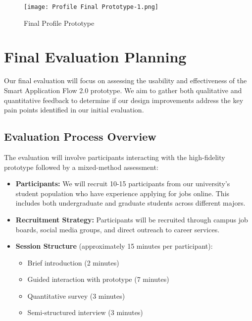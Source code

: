 \documentclass[
	letterpaper, %
]{jdf}
\begin{document}
\begin{sloppypar}
\begin{figure}
    \centering
    \texttt{[image: Profile Final Prototype-1.png]}
    \caption{Final Profile Prototype}
    \label{fig:enter-label}
\end{figure}

\newpage




\section{Final Evaluation Planning}

Our final evaluation will focus on assessing the usability and effectiveness of the Smart Application Flow 2.0 prototype. We aim to gather both qualitative and quantitative feedback to determine if our design improvements address the key pain points identified in our initial evaluation.

\subsection{Evaluation Process Overview}

The evaluation will involve participants interacting with the high-fidelity prototype followed by a mixed-method assessment:

\begin{itemize}
    \item \textbf{Participants:} We will recruit 10-15 participants from our university's student population who have experience applying for jobs online. This includes both undergraduate and graduate students across different majors.

    \item \textbf{Recruitment Strategy:} Participants will be recruited through campus job boards, social media groups, and direct outreach to career services. 

    \item \textbf{Session Structure} (approximately 15 minutes per participant):
    \begin{itemize}
        \item Brief introduction (2 minutes)
        \item Guided interaction with prototype (7 minutes)
        \item Quantitative survey (3 minutes)
        \item Semi-structured interview (3 minutes)
    \end{itemize}


\end{itemize}
\end{sloppypar}
\end{document}
